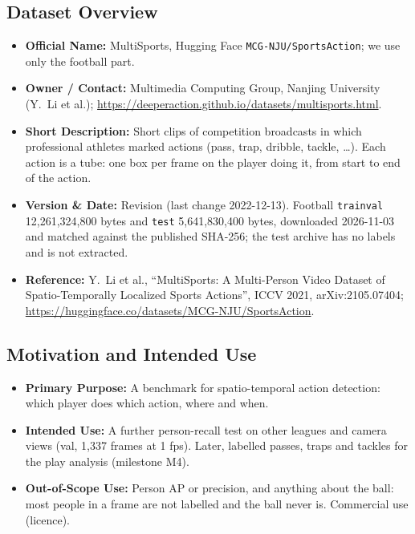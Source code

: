 \documentclass[11pt, a4paper]{article}
\begin{document}
\subsection{Dataset Overview}
\begin{itemize}
    \item \textbf{Official Name:} MultiSports, Hugging Face \texttt{MCG-NJU/SportsAction}; we use only the football part.
    \item \textbf{Owner / Contact:} Multimedia Computing Group, Nanjing University (Y.~Li et al.); \url{https://deeperaction.github.io/datasets/multisports.html}.
    \item \textbf{Short Description:} Short clips of competition broadcasts in which professional athletes marked actions (pass, trap, dribble, tackle, \ldots). Each action is a tube: one box per frame on the player doing it, from start to end of the action.
    \item \textbf{Version \& Date:} Revision  (last change 2022-12-13). Football \texttt{trainval} 12,261,324,800 bytes and \texttt{test} 5,641,830,400 bytes, downloaded 2026-11-03 and matched against the published SHA-256; the test archive has no labels and is not extracted.
    \item \textbf{Reference:} Y.~Li et al., ``MultiSports: A Multi-Person Video Dataset of Spatio-Temporally Localized Sports Actions'', ICCV 2021, arXiv:2105.07404; \url{https://huggingface.co/datasets/MCG-NJU/SportsAction}.
\end{itemize}

\subsection{Motivation and Intended Use}
\begin{itemize}
    \item \textbf{Primary Purpose:} A benchmark for spatio-temporal action detection: which player does which action, where and when.
    \item \textbf{Intended Use:} A further person-recall test on other leagues and camera views (val, 1,337 frames at 1 fps). Later, labelled passes, traps and tackles for the play analysis (milestone M4).
    \item \textbf{Out-of-Scope Use:} Person AP or precision, and anything about the ball: most people in a frame are not labelled and the ball never is. Commercial use (licence).
\end{itemize}
\end{document}
